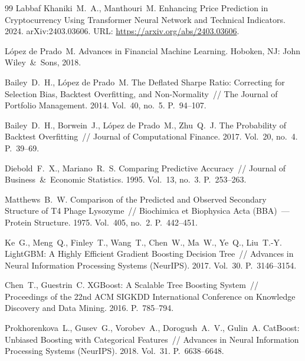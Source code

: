 \documentclass[12pt,a4paper]{report}
\begin{document}
\begin{thebibliography}{99}
 Labbaf Khaniki~M.~A., Manthouri~M. Enhancing Price Prediction
in Cryptocurrency Using Transformer Neural Network and Technical Indicators. 2024.
arXiv:2403.03606. URL: \url{https://arxiv.org/abs/2403.03606}.

 L\'opez de Prado~M. Advances in Financial Machine Learning.
Hoboken, NJ: John Wiley~\&~Sons, 2018.

 Bailey~D.~H., L\'opez de Prado~M. The Deflated Sharpe Ratio:
Correcting for Selection Bias, Backtest Overfitting, and Non-Normality~// The
Journal of Portfolio Management. 2014. Vol.~40, no.~5. P.~94--107.

 Bailey~D.~H., Borwein~J., L\'opez de Prado~M., Zhu~Q.~J. The
Probability of Backtest Overfitting~// Journal of Computational Finance. 2017.
Vol.~20, no.~4. P.~39--69.

 Diebold~F.~X., Mariano~R.~S. Comparing Predictive Accuracy~//
Journal of Business~\&~Economic Statistics. 1995. Vol.~13, no.~3. P.~253--263.

 Matthews~B.~W. Comparison of the Predicted and Observed
Secondary Structure of T4 Phage Lysozyme~// Biochimica et Biophysica Acta (BBA)~---
Protein Structure. 1975. Vol.~405, no.~2. P.~442--451.

 Ke~G., Meng~Q., Finley~T., Wang~T., Chen~W., Ma~W., Ye~Q.,
Liu~T.-Y. LightGBM: A Highly Efficient Gradient Boosting Decision Tree~//
Advances in Neural Information Processing Systems (NeurIPS). 2017. Vol.~30.
P.~3146--3154.

 Chen~T., Guestrin~C. XGBoost: A Scalable Tree Boosting System~//
Proceedings of the 22nd ACM SIGKDD International Conference on Knowledge Discovery
and Data Mining. 2016. P.~785--794.

 Prokhorenkova~L., Gusev~G., Vorobev~A., Dorogush~A.~V.,
Gulin~A. CatBoost: Unbiased Boosting with Categorical Features~// Advances in
Neural Information Processing Systems (NeurIPS). 2018. Vol.~31. P.~6638--6648.

\end{thebibliography}
\end{document}
